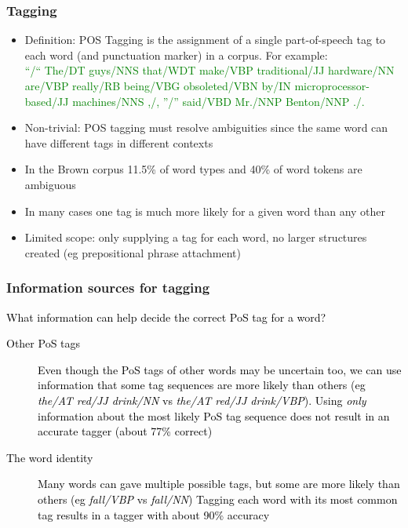 \begin{frame}[fragile]\frametitle{Tagging}
  \begin{itemize}
  \item Definition: POS Tagging is the assignment of a single
    part-of-speech tag to each word (and punctuation marker) in a
    corpus.  For example:\\
    {\scriptsize
    \textcolor{green}{``/``  The/DT  guys/NNS  that/WDT  make/VBP
      traditional/JJ  hardware/NN  are/VBP  really/RB  being/VBG
      obsoleted/VBN  by/IN  microprocessor-based/JJ  machines/NNS  ,/,
      ''/''  said/VBD  Mr./NNP  Benton/NNP  ./.}}
  \item Non-trivial: POS tagging must resolve ambiguities since the
    same word can have different tags in different contexts
  \item In the Brown corpus 11.5\% of word types and 40\% of word
    tokens are ambiguous
  \item In many cases one tag is much more likely for a given word
    than any other
  \item Limited scope: only supplying a tag for each word, no larger
    structures created (eg prepositional phrase attachment)
  \end{itemize}  
\end{frame}


\begin{frame}[fragile]\frametitle{Information sources for tagging}
  \textcolor{black}{
  What information can help decide the correct PoS tag for a word?
  \begin{description}
  \item[Other PoS tags] Even though the PoS tags of other words may be
    uncertain too, we can use information that some tag sequences are
    more likely than others (eg \emph{the/AT red/JJ drink/NN} vs \emph{the/AT
      red/JJ drink/VBP}).\newline
    Using \emph{only} information about the most likely PoS tag
    sequence does not result in an accurate tagger (about 77\%
    correct)
  \item[The word identity] Many words can gave multiple possible tags,
    but some are more likely than others (eg \emph{fall/VBP} vs
    \emph{fall/NN}) \newline
    Tagging each word with its most common tag results in a tagger
    with about 90\% accuracy
  \end{description}}
\end{frame}

